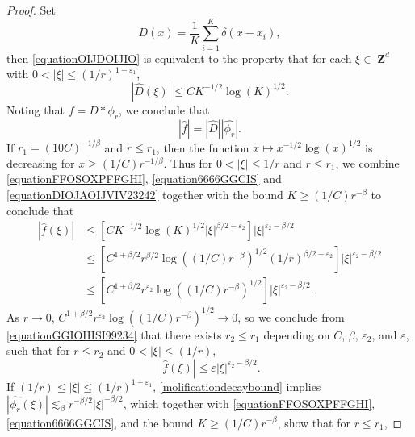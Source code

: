 \documentclass[12pt,reqno]{article}
\numberwithin{equation}{section}
\DeclareMathOperator{\ZZ}{\mathbf{Z}}
\begin{document}
\begin{proof}
    Set
    \[ D(x) = \frac{1}{K} \sum_{i = 1}^K \delta(x - x_i), \]
    then \eqref{equationOIJDOIJIO} is equivalent to the property that for each $\xi \in \ZZ^d$ with $0 < |\xi| \leq (1/r)^{1+\varepsilon_1}$,
    \begin{equation} \label{equationFFOSOXPFFGHI}
        |\widehat{D}(\xi)| \leq C K^{-1/2} \log(K)^{1/2}.
    \end{equation}
    Noting that $f = D * \phi_r$, we conclude that
    \begin{equation} \label{equation6666GGCIS}
        |\widehat{f}| = |\widehat{D}| |\widehat{\phi_r}|.
    \end{equation}
    If $r_1 = (10C)^{-1/\beta}$ and $r \leq r_1$, then the function $x \mapsto x^{-1/2} \log(x)^{1/2}$ is decreasing for $x \geq (1/C) r^{-1/\beta}$. Thus for $0 < |\xi| \leq 1/r$ and $r \leq r_1$, we combine \eqref{equationFFOSOXPFFGHI}, \eqref{equation6666GGCIS} and \eqref{equationDIOJAOIJVIV23242} together with the bound $K \geq (1/C) r^{-\beta}$ to conclude that
    \begin{equation} \label{equationGGIOHISI99234}
    \begin{split}
        |\widehat{f}(\xi)| &\leq \left[ C K^{-1/2} \log(K)^{1/2} |\xi|^{\beta/2 - \varepsilon_2} \right] |\xi|^{\varepsilon_2-\beta/2}\\
        &\leq \left[ C^{1 + \beta/2} r^{\beta/2} \log((1/C)r^{-\beta})^{1/2} (1/r)^{\beta/2 - \varepsilon_2} \right] |\xi|^{\varepsilon_2 - \beta/2}\\
        &\leq \left[ C^{1 + \beta/2} r^{\varepsilon_2} \log((1/C)r^{-\beta})^{1/2} \right] |\xi|^{\varepsilon_2 - \beta/2}.
    \end{split}
    \end{equation}
    As $r \to 0$, $C^{1 + \beta/2} r^{\varepsilon_2} \log((1/C)r^{-\beta})^{1/2} \to 0$, so we conclude from \eqref{equationGGIOHISI99234} that there exists $r_2 \leq r_1$ depending on $C$, $\beta$, $\varepsilon_2$, and $\varepsilon$, such that for $r \leq r_2$ and $0 < |\xi| \leq (1/r)$,
    \begin{equation} \label{equation663sdDDDCC}
        |\widehat{f}(\xi)| \leq \varepsilon |\xi|^{\varepsilon_2-\beta/2}.
    \end{equation}
    If $(1/r) \leq |\xi| \leq (1/r)^{1+\varepsilon_1}$, \eqref{molificationdecaybound} implies $|\widehat{\phi_{r}}(\xi)| \lesssim_\beta r^{-\beta/2} |\xi|^{-\beta/2}$, which together with \eqref{equationFFOSOXPFFGHI}, \eqref{equation6666GGCIS}, and the bound $K \geq (1/C) r^{-\beta}$, show that for $r \leq r_1$,

\end{proof}
\end{document}
